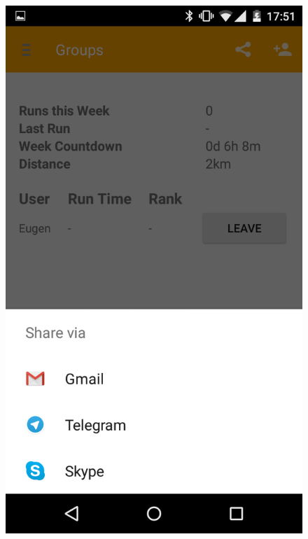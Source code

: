 \begin{figure}
\centering
\begin{minipage}{.4\textwidth}
  \centering
  \includegraphics[width=.8\linewidth]{abb/bsp/bsp5}
  \label{fig:bsp5}
\end{minipage}
\begin{minipage}{.4\textwidth}
  \centering

\end{minipage}
\end{figure}
